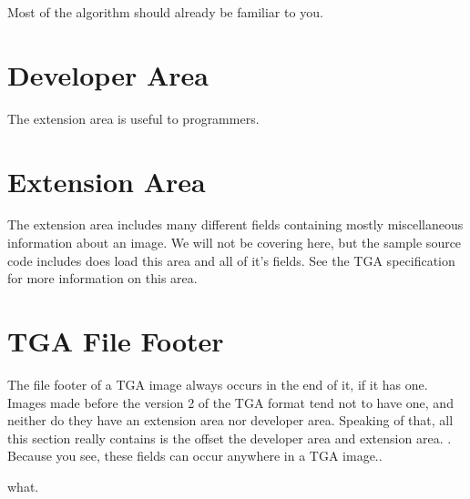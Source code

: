 \begin{refsection}
\begin{algorithm}[H]
\begin{algorithmic}[1]
              \process


            \EndRepeatn

          \Else



              \EndIf

              \process


            \EndRepeatn

          \EndIf
        \Else


          \EndIf

          \process


        \EndIf
      \EndWhile
    \end{algorithmic}
  \end{algorithm}

  Most of the algorithm should already be familiar to you.

  \section{Developer Area}

  The extension area is useful to programmers.

  \section{Extension Area}

  The extension area includes many different fields containing mostly
  miscellaneous information about an image. We will not be covering
  here, but the sample source code includes does load this area and
  all of it's fields. See the TGA specification for more information
  on this area.

  \section{TGA File Footer}

  The file footer of a TGA image always occurs in the end of it, if it
  has one. Images made before the version 2 of the TGA format tend not
  to have one, and neither do they have an extension area nor
  developer area. Speaking of that, all this section really contains
  is the offset the developer area and extension area. . Because you see, these fields can occur
  anywhere in a TGA image..

  what.

  \printbibliography[heading=subbibliography]

\end{refsection}